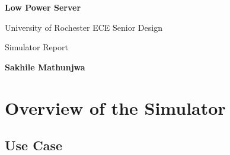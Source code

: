 \documentclass[letterpaper, 11pt, twoside]{article}
\begin{document}
\begin{titlepage}
	\begin{center}

	\vspace*{1cm}
	\Huge
	\textbf{Low Power Server}

	\vspace{0.5cm}
	\LARGE
	University of Rochester ECE Senior Design 

	\vspace{1cm}
	\LARGE
	Simulator Report
	\vspace{1.5cm}
	
	\textbf{Sakhile Mathunjwa} 
	\vfill
	
	
	\end{center}
\end{titlepage}
\clearpage

\tableofcontents

\clearpage

\section[Overview]{Overview of the Simulator}

\paragraph{}

\subsection{Use Case}
\paragraph{}
\end{document}
